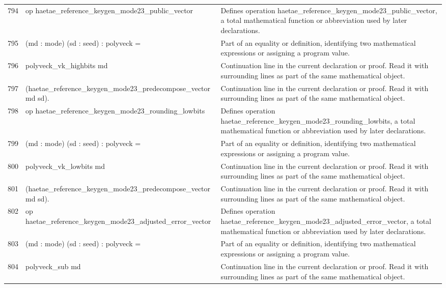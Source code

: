 \documentclass[10pt]{article}
\begin{document}
\begin{longtable}{r L{0.53\textwidth} L{0.37\textwidth}}
794 & {\ttfamily\scriptsize op haetae\_reference\_keygen\_mode23\_public\_vector} & Defines operation haetae\_reference\_keygen\_mode23\_public\_vector, a total mathematical function or abbreviation used by later declarations. \\
795 & {\ttfamily\scriptsize    (md : mode) (sd : seed) : polyveck =} & Part of an equality or definition, identifying two mathematical expressions or assigning a program value. \\
796 & {\ttfamily\scriptsize   polyveck\_vk\_highbits md} & Continuation line in the current declaration or proof.  Read it with surrounding lines as part of the same mathematical object. \\
797 & {\ttfamily\scriptsize     (haetae\_reference\_keygen\_mode23\_predecompose\_vector md sd).} & Continuation line in the current declaration or proof.  Read it with surrounding lines as part of the same mathematical object. \\
798 & {\ttfamily\scriptsize op haetae\_reference\_keygen\_mode23\_rounding\_lowbits} & Defines operation haetae\_reference\_keygen\_mode23\_rounding\_lowbits, a total mathematical function or abbreviation used by later declarations. \\
799 & {\ttfamily\scriptsize    (md : mode) (sd : seed) : polyveck =} & Part of an equality or definition, identifying two mathematical expressions or assigning a program value. \\
800 & {\ttfamily\scriptsize   polyveck\_vk\_lowbits md} & Continuation line in the current declaration or proof.  Read it with surrounding lines as part of the same mathematical object. \\
801 & {\ttfamily\scriptsize     (haetae\_reference\_keygen\_mode23\_predecompose\_vector md sd).} & Continuation line in the current declaration or proof.  Read it with surrounding lines as part of the same mathematical object. \\
802 & {\ttfamily\scriptsize op haetae\_reference\_keygen\_mode23\_adjusted\_error\_vector} & Defines operation haetae\_reference\_keygen\_mode23\_adjusted\_error\_vector, a total mathematical function or abbreviation used by later declarations. \\
803 & {\ttfamily\scriptsize    (md : mode) (sd : seed) : polyveck =} & Part of an equality or definition, identifying two mathematical expressions or assigning a program value. \\
804 & {\ttfamily\scriptsize   polyveck\_sub md} & Continuation line in the current declaration or proof.  Read it with surrounding lines as part of the same mathematical object. \\

\end{longtable}
\end{document}
